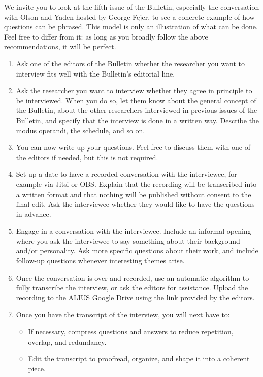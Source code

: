 \documentclass[11pt]{article}
\begin{document}
We invite you to look at the fifth issue of the Bulletin, especially the conversation with Olson and Yaden hosted by George Fejer, to see a concrete example of how questions can be phrased. This model is only an illustration of what can be done. Feel free to differ from it: as long as you broadly follow the above recommendations, it will be perfect.


\begin{enumerate}
\item Ask one of the editors of the Bulletin whether the researcher you want to interview fits well with the Bulletin's editorial line.
\item Ask the researcher you want to interview whether they agree in principle to be interviewed. When you do so, let them know about the general concept of the Bulletin, about the other researchers interviewed in previous issues of the Bulletin, and specify that the interview is done in a written way. Describe the modus operandi, the schedule, and so on.
\item You can now write up your questions. Feel free to discuss them with one of the editors if needed, but this is not required.
\item Set up a date to have a recorded conversation with the interviewee, for example via Jitsi or OBS. Explain that the recording will be transcribed into a written format and that nothing will be published without consent to the final edit. Ask the interviewee whether they would like to have the questions in advance.
\item Engage in a conversation with the interviewee. Include an informal opening where you ask the interviewee to say something about their background and/or personality. Ask more specific questions about their work, and include follow-up questions whenever interesting themes arise.
\item Once the conversation is over and recorded, use an automatic algorithm to fully transcribe the interview, or ask the editors for assistance. Upload the recording to the ALIUS Google Drive using the link provided by the editors.
\item Once you have the transcript of the interview, you will next have to:
  \begin{itemize}[label=\textendash,leftmargin=1.5em]
  \item If necessary, compress questions and answers to reduce repetition, overlap, and redundancy.
  \item Edit the transcript to proofread, organize, and shape it into a coherent piece.

\end{itemize}
\end{enumerate}
\end{document}

